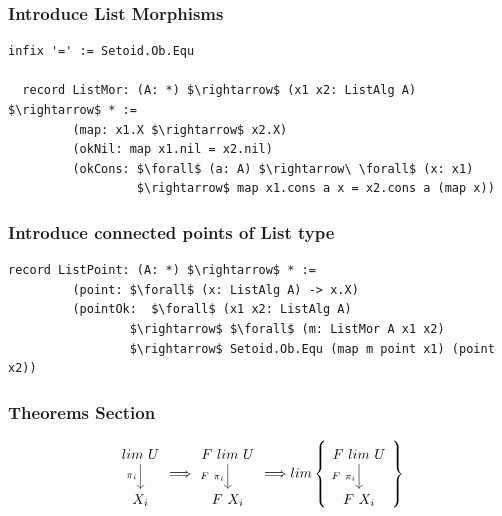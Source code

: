 \documentclass[11pt,oneside]{article}
\begin{document}
\subsubsection*{Introduce List Morphisms}

\begin{lstlisting}[mathescape=true]
  infix '=' := Setoid.Ob.Equ

  record ListMor: (A: *) $\rightarrow$ (x1 x2: ListAlg A) $\rightarrow$ * :=
         (map: x1.X $\rightarrow$ x2.X)
         (okNil: map x1.nil = x2.nil)
         (okCons: $\forall$ (a: A) $\rightarrow\ \forall$ (x: x1)
                  $\rightarrow$ map x1.cons a x = x2.cons a (map x))
\end{lstlisting}

\subsubsection*{Introduce connected points of List type}

\begin{lstlisting}[mathescape=true]
  record ListPoint: (A: *) $\rightarrow$ * :=
         (point: $\forall$ (x: ListAlg A) -> x.X)
         (pointOk:  $\forall$ (x1 x2: ListAlg A)
                 $\rightarrow$ $\forall$ (m: ListMor A x1 x2)
                 $\rightarrow$ Setoid.Ob.Equ (map m point x1) (point x2))

\end{lstlisting}

\subsubsection*{Theorems Section}

\begin{center}
$$
\begin{tikzcd}
  lim\ U \arrow{d}[left]{\pi_i} \\
  X_i 
\end{tikzcd}
\Longrightarrow
\begin{tikzcd}
  F\ lim\ U \arrow{d}[left]{F\ \pi_i} \\
  F\ X_i 
\end{tikzcd}
\Longrightarrow
lim\left\{
\begin{tikzcd}
  F\ lim\ U \arrow{d}[left]{F\ \pi_i} \\
  F\ X_i 
\end{tikzcd}
\right\}
$$
\end{center}
\end{document}
